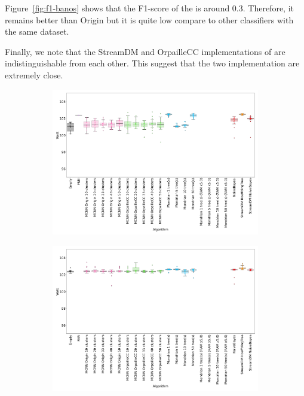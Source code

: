 Figure~\ref{fig:f1-banos} shows that the F1-score of the \FNN
is around 0.3. Therefore, it remains better than \mcnn Origin but it is quite
low compare to other classifiers with the same dataset.

Finally, we note that the StreamDM and OrpailleCC implementations of
\naivebayes are indistinguishable from each other. This suggest that the two
implementation are extremely close.

\begin{figure}
	\begin{subfigure}[t]{.49\linewidth}
		\includegraphics[width=\linewidth]{figures/results/banos_3_watt.png}
		\caption{\banosdataset}
		\label{fig:power-banos}
	\end{subfigure}
	\hfill
	\begin{subfigure}[t]{.49\linewidth}
		\includegraphics[width=\linewidth]{figures/results/recofit_3_watt.png}

\end{subfigure}
\end{figure}
